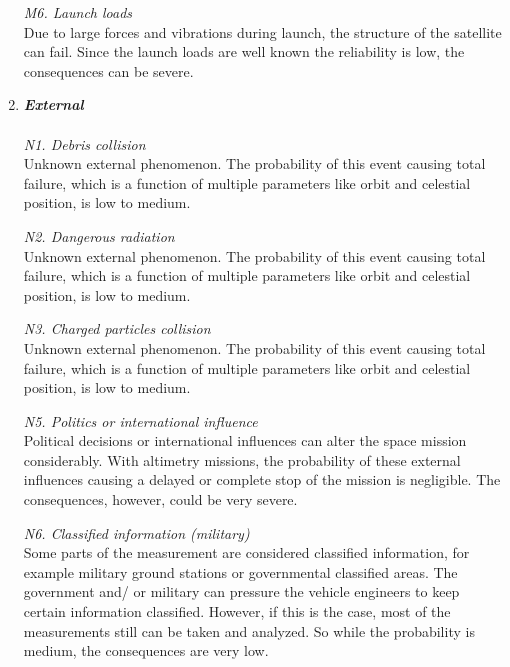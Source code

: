 \begin{enumerate}[A]
\textit{M6. Launch loads} \\
Due to large forces and vibrations during launch, the structure of the satellite can fail. Since the launch loads are well known the reliability is low, the consequences can be severe.

	\item\textbf{\textit{External}} \\\\
\textit{N1. Debris collision}\\ 
Unknown external phenomenon. The probability of this event causing total failure, which is a function of multiple parameters like orbit and celestial position, is low to medium. 

\textit{N2. Dangerous radiation}\\ 
Unknown external phenomenon. The probability of this event causing total failure, which is a function of multiple parameters like orbit and celestial position, is low to medium. 

\textit{N3. Charged particles collision}\\ 
Unknown external phenomenon. The probability of this event causing total failure, which is a function of multiple parameters like orbit and celestial position, is low to medium. 

\textit{N5. Politics or international influence}\\ 
Political decisions or international influences can alter the space mission considerably.  With altimetry missions, the probability of these external influences causing a delayed or complete stop of the mission is negligible. The consequences, however, could be very severe. 

\textit{N6. Classified information (military)}\\ 
Some parts of the measurement are considered classified information, for example military ground stations or governmental classified areas. The government and/ or military can pressure the vehicle engineers to keep certain information classified. However, if this is the case, most of the measurements still can be taken and analyzed. So while the probability is medium, the consequences are very low.


\end{enumerate}
